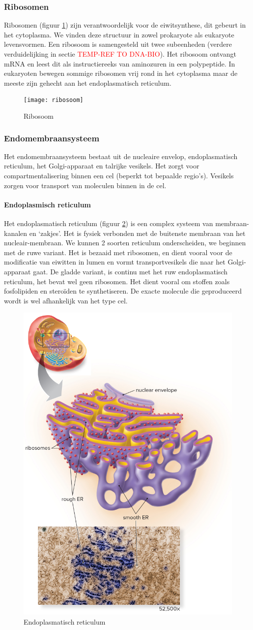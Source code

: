 \documentclass[a4paper,kul]{kulakarticle} %
\begin{document}
\subsubsection{Ribosomen}
Ribosomen (figuur \ref{fig:ribosoom}) zijn verantwoordelijk voor de eiwitsynthese, dit gebeurt in het cytoplasma. We vinden deze structuur in zowel prokaryote als eukaryote levensvormen. Een ribosoom is samengesteld uit twee subeenheden (verdere verduidelijking in sectie \textcolor{red}{TEMP-REF TO DNA-BIO}). Het ribosoom ontvangt mRNA en leest dit als instructiereeks van aminozuren in een polypeptide. In eukaryoten bewegen sommige ribosomen vrij rond in het cytoplasma maar de meeste zijn gehecht aan het endoplasmatisch reticulum. 
\begin{figure}[h]
	\centering
	\texttt{[image: ribosoom]}
	\caption[Ribosoom]{Ribosoom}
	\label{fig:ribosoom}
\end{figure}

\subsubsection{Endomembraansysteem}
Het endomembraansysteem bestaat uit de nucleaire envelop, endoplasmatisch reticulum, het Golgi-apparaat en talrijke vesikels. Het zorgt voor compartmentalisering binnen een cel (beperkt tot bepaalde regio's). Vesikels zorgen voor transport van moleculen binnen in de cel.
\paragraph{Endoplasmisch reticulum}
Het endoplasmatisch reticulum (figuur \ref{fig:endoplasmatisch-reticulum}) is een complex systeem van membraan-kanalen en `zakjes'. Het is fysiek verbonden met de buitenste membraan van het nucleair-membraan. We kunnen 2 soorten reticulum onderscheiden, we beginnen met de ruwe variant. Het is bezaaid met ribosomen, en dient vooral voor de modificatie van eiwitten in lumen en vormt transportvesikels die naar het Golgi-apparaat gaat. De gladde variant, is continu met het ruw endoplasmatisch reticulum, het bevat wel geen ribosomen.  Het dient vooral om stoffen zoals fosfolipiden en steroïden te synthetiseren. De exacte molecule die geproduceerd wordt is wel afhankelijk van het type cel.  
\begin{figure}[h]
	\centering
	\includegraphics[width=0.4\linewidth]{"Endoplasmatisch reticulum"}
	\caption[Endoplasmatisch reticulum]{Endoplasmatisch reticulum}
	\label{fig:endoplasmatisch-reticulum}
\end{figure}
\end{document}
